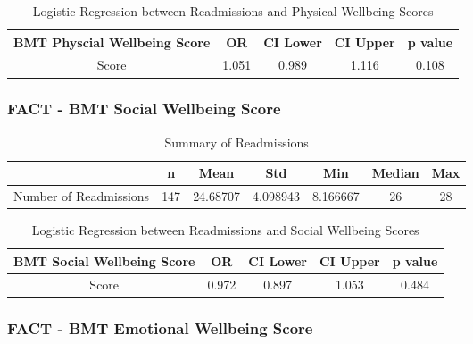 \documentclass[12pt,]{article}
\begin{document}
\begin{table}[!h]

\caption{\label{tab:unnamed-chunk-31}Logistic Regression between Readmissions and Physical Wellbeing Scores}
\centering
\begin{tabular}{ccccc}
\toprule
BMT Physcial Wellbeing Score & OR & CI Lower & CI Upper & p value\\
\midrule
\rowcolor{white}  Score & 1.051 & 0.989 & 1.116 & 0.108\\
\bottomrule
\end{tabular}
\end{table}

\pagebreak

\subsubsection{FACT - BMT Social Wellbeing
Score}\label{fact---bmt-social-wellbeing-score}

\begin{table}[!h]

\caption{\label{tab:unnamed-chunk-32}Summary of Readmissions}
\centering
\begin{tabular}{>{\raggedright\arraybackslash}p{5cm}cccccc}
\toprule
  & n & Mean & Std & Min & Median & Max\\
\midrule
\rowcolor{white}  Number of Readmissions & 147 & 24.68707 & 4.098943 & 8.166667 & 26 & 28\\
\bottomrule
\end{tabular}
\end{table}

\begin{table}[!h]

\caption{\label{tab:unnamed-chunk-32}Logistic Regression between Readmissions and Social Wellbeing Scores}
\centering
\begin{tabular}{ccccc}
\toprule
BMT Social Wellbeing Score & OR & CI Lower & CI Upper & p value\\
\midrule
\rowcolor{white}  Score & 0.972 & 0.897 & 1.053 & 0.484\\
\bottomrule
\end{tabular}
\end{table}

\pagebreak

\subsubsection{FACT - BMT Emotional Wellbeing
Score}\label{fact---bmt-emotional-wellbeing-score}
\end{document}
